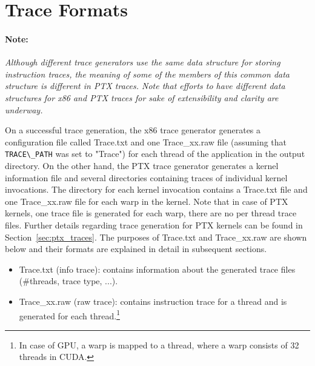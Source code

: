 \section{Trace Formats}
\label{sec:traceformat}

\paragraph{Note:}

\textit{Although different trace generators use the same data structure for
storing instruction traces, the meaning of some of the members of this
common data structure is different in PTX traces. Note that efforts to
have different data structures for x86 and PTX traces for sake of
extensibility and clarity are underway.}


On a successful trace generation, the x86 trace generator generates a
configuration file called Trace.txt and one Trace\_xx.raw file
(assuming that \Verb+TRACE\_PATH+ was set to "Trace") for each thread
of the application in the output directory. On the other hand, the PTX
trace generator generates a kernel information file and several
directories containing traces of individual kernel invocations. The
directory for each kernel invocation contains a Trace.txt file and one
Trace\_xx.raw file for each warp in the kernel.  Note that in case of
PTX kernels, one trace file is generated for each warp, there are no
per thread trace files. Further details regarding trace generation for
PTX kernels can be found in Section~\ref{sec:ptx_traces}. The purposes
of Trace.txt and Trace\_xx.raw are shown below and their formats are
explained in detail in subsequent sections.


\begin{itemize}\itemsep2pt
\item Trace.txt (info trace): contains information about the generated
  trace files (\#threads, trace type, ...).

\item Trace\_xx.raw (raw trace): contains instruction trace for a
  thread and is generated for each thread.\footnote{In case of GPU, a
    warp is mapped to a \SIM thread, where a warp consists of 32
    threads in CUDA.}
\end{itemize}



